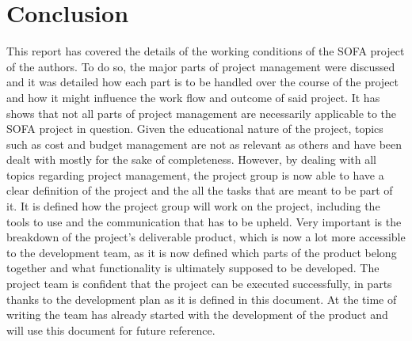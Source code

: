 \section{Conclusion}
\label{sec:Conclusion}

This report has covered the details of the working conditions of the SOFA project of the authors. To do so, the major parts of project management were discussed and it was detailed how each part is to be handled over the course of the project and how it might influence the work flow and outcome of said project.
\newline
It has shows that not all parts of project management are necessarily applicable to the SOFA project in question. Given the educational nature of the project, topics such as cost and budget management are not as relevant as others and have been dealt with mostly for the sake of completeness.
\newline
However, by dealing with all topics regarding project management, the project group is now able to have a clear definition of the project and the all the tasks that are meant to be part of it. It is defined how the project group will work on the project, including the tools to use and the communication that has to be upheld.
\newline
Very important is the breakdown of the project's deliverable product, which is now a lot more accessible to the development team, as it is now defined which parts of the product belong together and what functionality is ultimately supposed to be developed.
\newline
The project team is confident that the project can be executed successfully, in parts thanks to the development plan as it is defined in this document. At the time of writing the team has already started with the development of the product and will use this document for future reference.